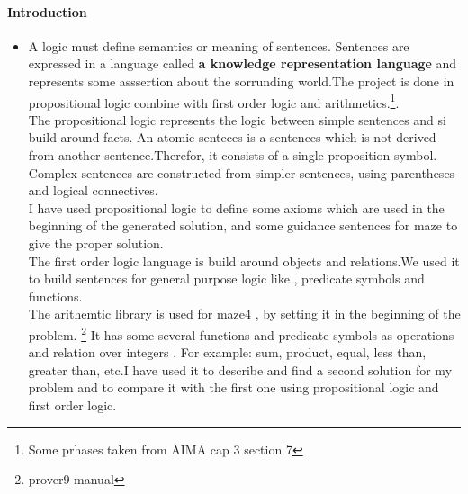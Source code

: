 
\graphicspath{ {images/} }
\paragraph{Introduction}

\begin{itemize}
\item
	\tab A logic must define semantics or meaning of sentences. Sentences are expressed in a language called \textbf{a knowledge representation language} and represents some asssertion about the sorrunding world.The project is done in propositional logic combine with first order logic and arithmetics.\footnote{Some prhases taken from AIMA cap 3  section 7}.\\
	\tab The propositional logic represents the logic between simple sentences and si build around facts. An atomic senteces is a sentences which is not derived from another sentence.Therefor, it consists of a single proposition symbol. Complex sentences are constructed from simpler sentences, using parentheses and logical connectives.\\
I have used propositional logic to define some axioms which are used in the beginning of the generated solution, and some guidance sentences for maze to give the proper solution.\\
	\tab The first order logic language is build around objects and relations.We used it to build sentences for general purpose logic like , predicate symbols and functions.\\
	\tab The arithemtic library is used for maze4 , by setting it in the beginning of the problem. \footnote{prover9 manual} It has some several functions and predicate symbols as operations and relation over integers . For example: sum, product, equal, less than, greater than, etc.I have used it to describe and find a second solution for my problem and to compare it with the first one using propositional logic and first order logic.\\
\end{itemize}

